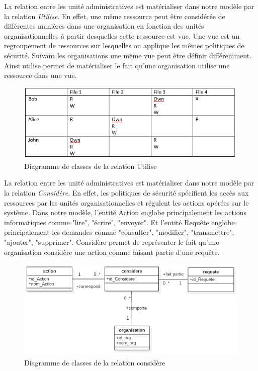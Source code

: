 La relation entre les unité administratives est matérialiser dans  notre modèle par la relation \textit{Utilise}. En effet, une même ressource peut être considérée de différentes manières dans une organisation en fonction des unités organisationnelles à partir desquelles cette ressource est vue. Une vue est un regroupement de ressources sur lesquelles on applique les mêmes politiques de sécurité. Suivant les organisations une même vue peut être définir différemment. Ainsi utilise permet de matérialiser le fait qu'une organisation utilise une ressource dans une vue.

\begin{figure}[h!]
    \centering
		\includegraphics[scale=0.7]{chap2/images/ACM.png}
    \caption{Diagramme de classes de la relation Utilise}
	 \label{figAcm}
\end{figure} 

\label{sectionActionRequêtes}

La relation entre les unité administratives est matérialiser dans  notre modèle par la relation \textit{Considère}. En effet, les politiques de sécurité spécifient les accès aux ressources par les unités organisationnelles et régulent les actions opérées sur le système. Dans notre modèle, l'entité Action englobe principalement les actions informatiques comme "lire", "écrire", "envoyer". Et l'entité Requête englobe principalement les demandes comme "consulter", "modifier", "transmettre", "ajouter", "supprimer". Considère permet de représenter le fait qu'une  organisation considère une action comme faisant partie d'une requête.

\begin{figure}[h!]
    \centering
		\includegraphics[scale=0.7]{chap3/images/considere.png}
    \caption{Diagramme de classes de la relation considère}
	 \label{figconsidere}
\end{figure} 

